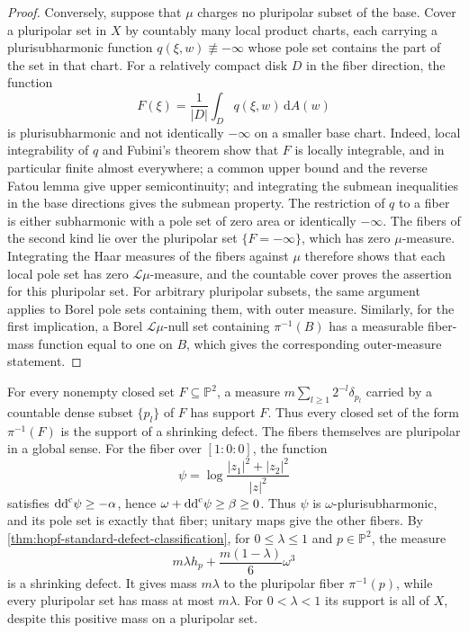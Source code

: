 \begin{proof}
Conversely, suppose that $\mu$ charges no pluripolar subset of the base. Cover a pluripolar set in $X$ by countably many local product charts, each carrying a plurisubharmonic function $q(\xi,w)\not\equiv-\infty$ whose pole set contains the part of the set in that chart. For a relatively compact disk $D$ in the fiber direction, the function
\[
 F(\xi)=\frac1{|D|}\int_Dq(\xi,w)\,\mathrm{d}A(w)
\]
is plurisubharmonic and not identically $-\infty$ on a smaller base chart. Indeed, local integrability of $q$ and Fubini's theorem show that $F$ is locally integrable, and in particular finite almost everywhere; a common upper bound and the reverse Fatou lemma give upper semicontinuity; and integrating the submean inequalities in the base directions gives the submean property. The restriction of $q$ to a fiber is either subharmonic with a pole set of zero area or identically $-\infty$. The fibers of the second kind lie over the pluripolar set $\{F=-\infty\}$, which has zero $\mu$-measure. Integrating the Haar measures of the fibers against $\mu$ therefore shows that each local pole set has zero $\mathcal L\mu$-measure, and the countable cover proves the assertion for this pluripolar set. For arbitrary pluripolar subsets, the same argument applies to Borel pole sets containing them, with outer measure. Similarly, for the first implication, a Borel $\mathcal L\mu$-null set containing $\pi^{-1}(B)$ has a measurable fiber-mass function equal to one on $B$, which gives the corresponding outer-measure statement.
\end{proof}

For every nonempty closed set $F\subseteq\mathbb P^2$, a measure $m\sum_{l\geq1}2^{-l}\delta_{p_l}$ carried by a countable dense subset $\{p_l\}$ of $F$ has support $F$. Thus every closed set of the form $\pi^{-1}(F)$ is the support of a shrinking defect. The fibers themselves are pluripolar in a global sense. For the fiber over $[1:0:0]$, the function
\[
 \psi=\log\frac{|z_1|^2+|z_2|^2}{|z|^2}
\]
satisfies $\mathrm{dd}^{\mathrm{c}}\psi\geq-\alpha$, hence $\omega+\mathrm{dd}^{\mathrm{c}}\psi\geq\beta\geq0$. Thus $\psi$ is $\omega$-plurisubharmonic, and its pole set is exactly that fiber; unitary maps give the other fibers. By \cref{thm:hopf-standard-defect-classification}, for $0\leq\lambda\leq1$ and $p\in\mathbb P^2$, the measure
\[
 m\lambda h_p+\frac{m(1-\lambda)}6\omega^3
\]
is a shrinking defect. It gives mass $m\lambda$ to the pluripolar fiber $\pi^{-1}(p)$, while every pluripolar set has mass at most $m\lambda$. For $0<\lambda<1$ its support is all of $X$, despite this positive mass on a pluripolar set.

